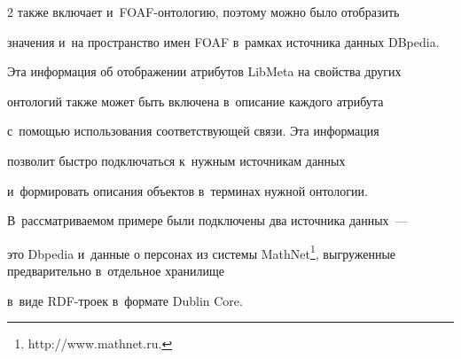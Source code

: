 \begin{multicols}{2}
также включает и~FOAF-он\-то\-ло\-гию, поэтому можно было отобразить 

значения и~на пространство имен FOAF в~рамках источника данных DBpedia.





    

    Эта информация об отображении атрибутов \mbox{LibMeta} на свойства других 

онтологий также может быть включена в~описание каждого атрибута 

с~помощью использования соответствующей связи. Эта информация 

позволит быстро подключаться к~нужным источникам данных 

и~формировать описания объектов в~терминах нужной онтологии.

В~рас\-смат\-ри\-ва\-емом примере были подключены два источника данных~--- 

это Dbpedia и~данные о персонах из системы MathNet\footnote[3]{{\sf  

http://www.mathnet.ru.}}, выгруженные предварительно в~отдельное хранилище 

в~виде RDF-тро\-ек в~формате Dublin Core.









\end{multicols}



